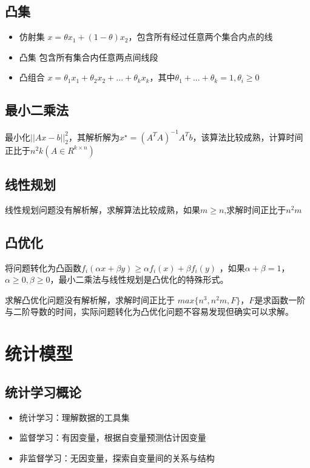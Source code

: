\documentclass[]{book}
\providecommand{\tightlist}{%
  \setlength{\itemsep}{0pt}\setlength{\parskip}{0pt}}
\begin{document}
\section{凸集}

\begin{itemize}
\item
  仿射集 \(x = \theta x_1 + (1-\theta)x_2\)，包含所有经过任意两个集合内点的线
\item
  凸集 包含所有集合内任意两点间线段
\item
  凸组合 \(x = \theta_1x_1+\theta_2x_2+...+\theta_kx_k\)，其中\(\theta_1+...+\theta_k = 1, \theta_i \geq 0\)
\end{itemize}

\section{最小二乘法}

最小化\(||Ax-b||_2^2\)，其解析解为\(x^\star = (A^TA)^{-1}A^Tb\)，该算法比较成熟，计算时间正比于\(n^2k(A\in R^{k\times n})\)

\section{线性规划}

线性规划问题没有解析解，求解算法比较成熟，如果\(m\geq n\),求解时间正比于\(n^2m\)

\section{凸优化}

将问题转化为凸函数\(f_i(\alpha x+\beta y)\geq \alpha f_i(x)+\beta f_i(y)\) ，如果\(\alpha + \beta = 1\)，\(\alpha \geq 0, \beta\geq 0\)，最小二乘法与线性规划是凸优化的特殊形式。

求解凸优化问题没有解析解，求解时间正比于 \(max\{ n^3,n^2m,F\}\)，\(F\)是求函数一阶与二阶导数的时间，实际问题转化为凸优化问题不容易发现但确实可以求解。

\chapter{统计模型}

\section{统计学习概论}

\begin{itemize}
\tightlist
\item
  统计学习：理解数据的工具集
\item
  监督学习：有因变量，根据自变量预测估计因变量
\item
  非监督学习：无因变量，探索自变量间的关系与结构
\end{itemize}
\end{document}
